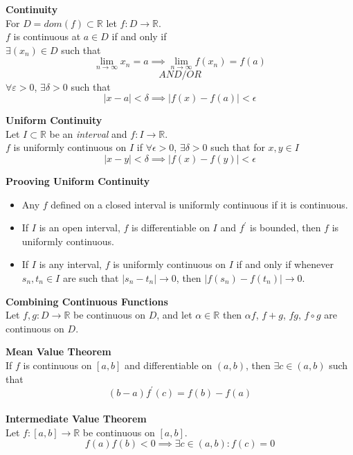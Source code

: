 \documentclass[a4paper, 10pt]{article}
\begin{document}
\begin{multicols*}{3}
\textbf{Continuity} \\
For $D=dom(f)\subset\mathbb{R}$ let $f: D \rightarrow \mathbb{R}$.\\
$f$ is continuous at $a \in D$ if and only if\\

$\exists\left(x_n\right)\in D$ such that
$$\lim _{n \rightarrow \infty} x_n= a\implies\lim _{n \rightarrow \infty} f\left(x_n\right)=f(a)$$
$${AND/OR}$$
$\forall\varepsilon>0$,  $\exists \delta>0$ such that 
$$|x-a|<\delta \implies |f(x)-f(a)|<\epsilon$$

\textbf{Uniform Continuity} \\
Let $I\subset \mathbb{R}$ be an \textit{interval} and $f: I \rightarrow \mathbb{R}$.\\
$f$ is uniformly continuous on $I$ if $\forall\epsilon>0$, $\exists\delta>0$ such that for $x, y \in I$
$$|x-y|<\delta\implies |f(x)-f(y)|<\epsilon$$

\textbf{Prooving Uniform Continuity}
\begin{itemize}[label=\textbullet, labelsep=0.3em, leftmargin=1em]
\item Any $f$ defined on a closed interval is uniformly continuous if it is continuous.
\item If $I$ is an open interval, $f$ is differentiable on $I$ and $f^{\prime}$ is bounded, then $f$ is uniformly continuous.
\item If $I$ is any interval, $f$ is uniformly continuous on $I$ if and only if whenever $s_n, t_n \in I$ are such that $\left|s_n-t_n\right| \rightarrow 0$, then $\left|f\left(s_n\right)-f\left(t_n\right)\right| \rightarrow 0$.
\end{itemize}


\textbf{Combining Continuous Functions}\\
Let $f, g: D \rightarrow \mathbb{R}$ be continuous on $D$, and let $\alpha \in \mathbb{R}$ then $\alpha f$, $f+g$, $f g$, $f\circ g$ are continuous on $D$.

\textbf{Mean Value Theorem}\\	
If $f$ is continuous on $[a, b]$ and differentiable on $(a, b)$, then $\exists c\in(a, b)$ such that 
$$
(b-a)f^{\prime}(c)=f(b)-f(a)
$$
\\

\textbf{Intermediate Value Theorem} \\
Let $f:[a, b] \rightarrow \mathbb{R}$ be continuous on $[a, b]$. \\
$$f(a) f(b)<0\implies\exists c \in(a, b) : f(c)=0$$


\end{multicols*}
\end{document}
